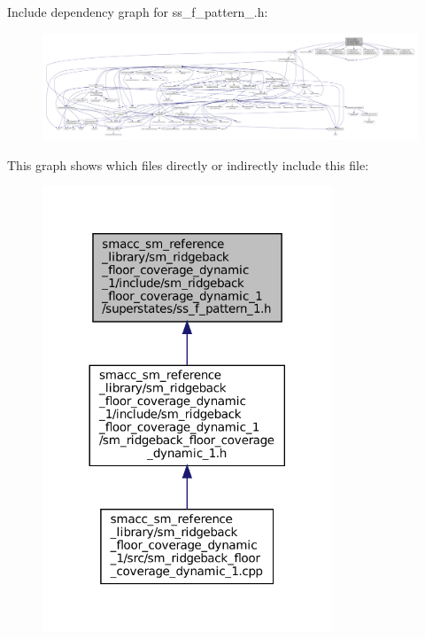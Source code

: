 Include dependency graph for ss\+\_\+f\+\_\+pattern\+\_.\+h\+:
\nopagebreak
\begin{figure}[H]
\begin{center}
\leavevmode
\includegraphics[width=350pt]{sm__ridgeback__floor__coverage__dynamic__1_2include_2sm__ridgeback__floor__coverage__dynamic__1_35e9b6fc18a1bc118a778e8ec0d32134}
\end{center}
\end{figure}
This graph shows which files directly or indirectly include this file\+:
\nopagebreak
\begin{figure}[H]
\begin{center}
\leavevmode
\includegraphics[width=245pt]{sm__ridgeback__floor__coverage__dynamic__1_2include_2sm__ridgeback__floor__coverage__dynamic__1_21870a4a292ee7ddd4393d84b991d3a9}
\end{center}
\end{figure}
